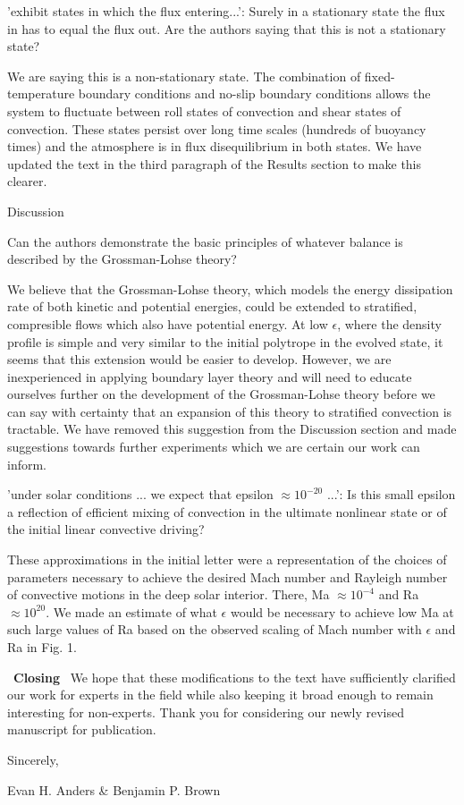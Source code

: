 \documentclass[aps, 11pt, singlecolumn]{revtex4-1} %
\begin{document}
\begin{singlespace}
\begin{myquotation}
'exhibit states in which the flux entering...': Surely in a
stationary state the flux in has to equal the flux out. Are the
authors saying that this is not a stationary state?
\end{myquotation}
We are saying this is a non-stationary state.  The combination of fixed-temperature
boundary conditions and no-slip boundary conditions allows the system to fluctuate between
roll states of convection and shear states of convection.  These states persist over long
time scales (hundreds of buoyancy times) and the atmosphere is in flux disequilibrium in both states.
We have updated the text in the third paragraph of the Results section to make this clearer.

\begin{myquotation}
Discussion

Can the authors demonstrate the basic principles of whatever balance
is described by the Grossman-Lohse theory?
\end{myquotation}
We believe that the Grossman-Lohse theory, which models the energy dissipation rate of both
kinetic and potential energies, could be extended to stratified, compresible flows which also
have potential energy.  At low $\epsilon$, where the density profile is simple and very similar
to the initial polytrope in the evolved state, it seems that this extension would be easier to
develop.  However, we are inexperienced in applying boundary layer theory and 
will need to educate ourselves
further on the development of the Grossman-Lohse theory before we can say
with certainty that an expansion of this theory to stratified convection is tractable. 
We have removed this suggestion from
the Discussion section and made suggestions towards further experiments which we are certain our
work can inform.


\begin{myquotation}
'under solar conditions ... we expect that epsilon  $\approx 10^{-20}$
...': Is this small epsilon a reflection of efficient mixing of
convection in the ultimate nonlinear state or of the initial linear
convective driving?
\end{myquotation}
These approximations in the initial letter were a representation of the choices of
parameters necessary to achieve the desired Mach number and Rayleigh number of convective
motions in the deep solar interior.  There, Ma $\approx 10^{-4}$ and Ra $\approx 10^{20}$.
We made an estimate of what $\epsilon$ would be necessary to achieve low Ma at such large
values of Ra based on the observed scaling of Mach number with $\epsilon$ and Ra
in Fig. 1.

$\,$
\newline
\noindent
\textbf{Closing}
\newline
$\,$\newline
We hope that these modifications to the text have sufficiently clarified our work for experts
in the field while also keeping it broad enough to remain interesting for non-experts.
Thank you for considering our newly revised manuscript for publication.

\end{singlespace}


\noindent
Sincerely,

Evan H. Anders \& Benjamin P. Brown




\end{document}
